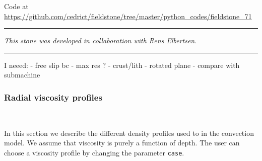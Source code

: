 

\begin{center}
Code at \url{https://github.com/cedrict/fieldstone/tree/master/python_codes/fieldstone_71}
\end{center}

\par\noindent\rule{\textwidth}{0.4pt}

{\sl This stone was developed in collaboration with Rens Elbertsen}. 

\par\noindent\rule{\textwidth}{0.4pt}

I neeed:
- free slip bc
- max res ?
- crust/lith
- rotated plane 
- compare with submachine


\subsubsection*{Radial viscosity profiles}

\

In this section we describe the different density profiles used to in the convection model. We assume that viscosity is purely a function of depth. The user can choose a viscosity profile by changing the parameter \texttt{case}.

